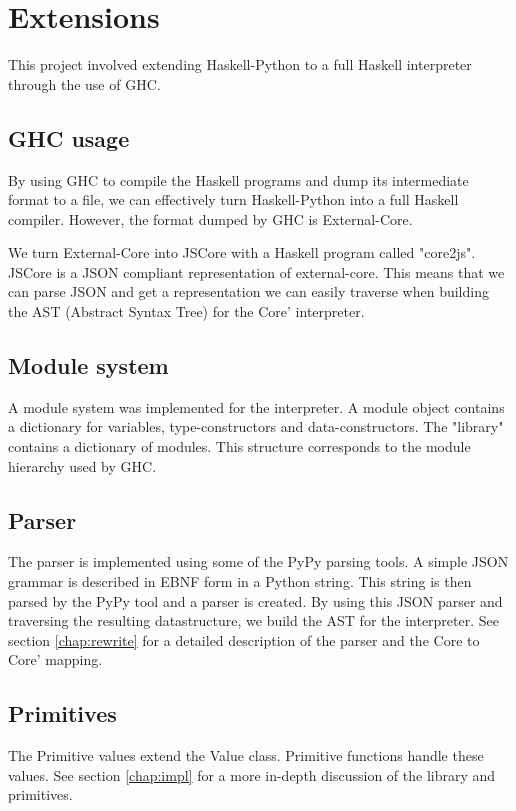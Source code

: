 \section{Extensions}

This project involved extending Haskell-Python to a full Haskell interpreter 
through the use of GHC.

\subsection*{GHC usage}


By using GHC to compile the Haskell programs and dump its intermediate
format to a file, we can effectively turn Haskell-Python into a full
Haskell compiler. However, the format dumped by GHC is External-Core.

We turn External-Core into JSCore with a Haskell program called "core2js".
JSCore is a JSON compliant representation of external-core. This means that
we can parse JSON and get a representation we can easily traverse when building
the AST (Abstract Syntax Tree) for the Core' interpreter.

\subsection*{Module system}

A module system was implemented for the interpreter. A module object contains
a dictionary for variables, type-constructors and data-constructors. The 
"library" contains a dictionary of modules. This structure corresponds to the
module hierarchy used by GHC.

\subsection*{Parser}


The parser is implemented using some of the PyPy parsing tools. A simple 
JSON grammar is described in EBNF form in a Python string. This string
is then parsed by the PyPy tool and a parser is created. By using this JSON
parser and traversing the resulting datastructure, we build the AST for the 
interpreter. See section \ref{chap:rewrite} for a detailed description of 
the parser and the Core to Core' mapping.

\subsection*{Primitives}

The Primitive values extend the Value class. Primitive functions handle
these values.
See section \ref{chap:impl} for a more in-depth discussion of the
library and primitives.

